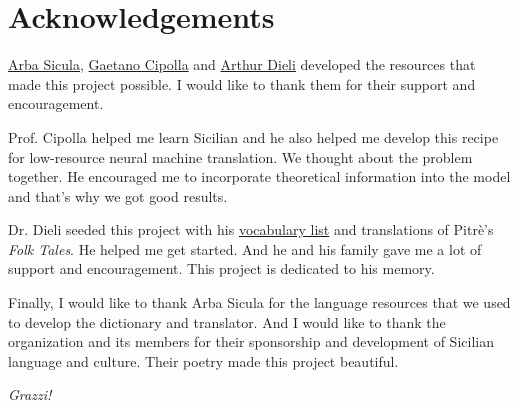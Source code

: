 \documentclass[10pt,letterpaper]{article}
\begin{document}




\hypertarget{acknowledgements}{}

\section*{Acknowledgements}

\vspace{-0.250em}
\href{https://www.arbasicula.org/}{Arba Sicula},
\href{https://en.wikipedia.org/wiki/Gaetano_Cipolla}{Gaetano Cipolla} and
\href{http://www.dieli.net/}{Arthur Dieli}
developed the resources that made this project possible.
I would like to thank them for their support and encouragement.

\vspace{-0.125em}
Prof. Cipolla helped me learn Sicilian and he also helped me develop this recipe for
low-resource neural machine translation.  We thought about the problem together.
He encouraged me to incorporate theoretical information into the model and that's
why we got good results.

\vspace{-0.125em}
Dr. Dieli seeded this project with his
\href{http://www.dieli.net/SicilyPage/SicilianLanguage/Vocabulary.html}{vocabulary list}
and translations of Pitrè's \textit{Folk Tales}.  He helped me get started.
And he and his family gave me a lot of support and encouragement.
This project is dedicated to his memory.

\vspace{-0.125em}
Finally, I would like to thank Arba Sicula for the language resources that we used to develop
the dictionary and translator.  And I would like to thank the organization and its members
for their sponsorship and development of Sicilian language and culture.
Their poetry made this project beautiful.

\vspace{-0.125em}
\textit{Grazzi!}


\end{document}
